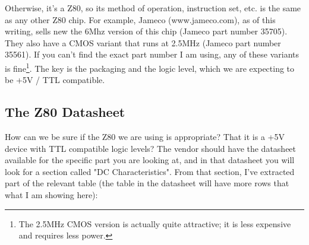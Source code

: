 \documentclass[10pt]{report}
\begin{document}
Otherwise, it's a Z80, so its method of operation, instruction set, etc. is the same as any other Z80 chip. For example, Jameco (www.jameco.com), as of this writing, sells new the 6Mhz version of this chip (Jameco part number 35705). They also have a CMOS variant that runs at 2.5MHz (Jameco part number 35561). If you can't find the exact part number I am using, any of these variants is fine\footnote{The 2.5MHz CMOS version is actually quite attractive; it is less expensive and requires less power.}. The key is the packaging and the logic level, which we are expecting to be +5V / TTL compatible. 

\subsection{The Z80 Datasheet}

How can we be sure if the Z80 we are using is appropriate? That it is a +5V device with TTL compatible logic levels? The vendor should have the datasheet available for the specific part you are looking at, and in that datasheet you will look for a section called "DC Characteristics". From that section, I've extracted part of the relevant table (the table in the datasheet will have more rows that what I am showing here):


\end{document}
